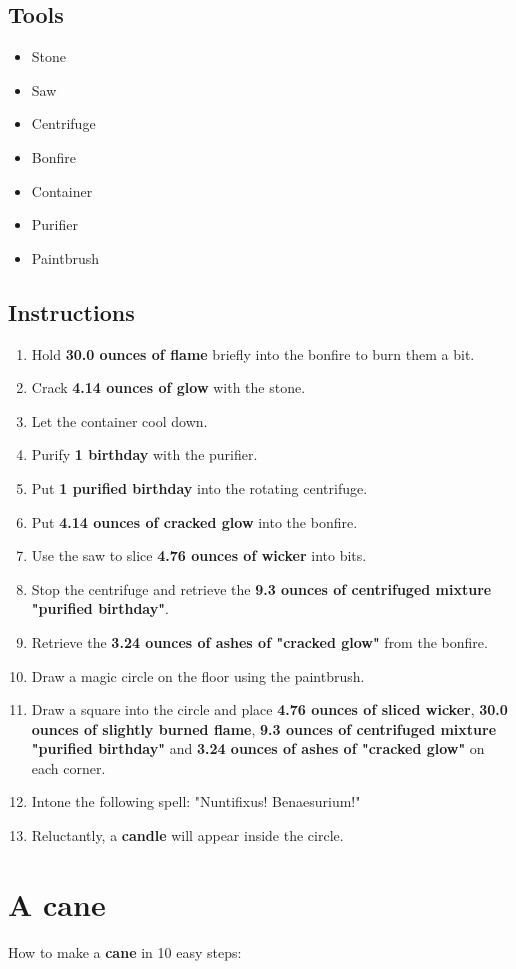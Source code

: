 \documentclass{article}
\begin{document}
\subsection{Tools}\begin{itemize}
\item 
Stone
\item 
Saw
\item 
Centrifuge
\item 
Bonfire
\item 
Container
\item 
Purifier
\item 
Paintbrush
\end{itemize}
\subsection{Instructions}\begin{enumerate}
\item 
Hold \textbf{30.0 ounces of flame} briefly into the bonfire to burn them a bit.
\item 
Crack \textbf{4.14 ounces of glow} with the stone.
\item 
Let the container cool down.
\item 
Purify \textbf{1 birthday} with the purifier.
\item 
Put \textbf{1 purified birthday} into the rotating centrifuge.
\item 
Put \textbf{4.14 ounces of cracked glow} into the bonfire.
\item 
Use the saw to slice \textbf{4.76 ounces of wicker} into bits.
\item 
Stop the centrifuge and retrieve the \textbf{9.3 ounces of centrifuged mixture "purified birthday"}.
\item 
Retrieve the \textbf{3.24 ounces of ashes of "cracked glow"} from the bonfire.
\item 
Draw a magic circle on the floor using the paintbrush.
\item 
Draw a square into the circle and place \textbf{4.76 ounces of sliced wicker}, \textbf{30.0 ounces of slightly burned flame}, \textbf{9.3 ounces of centrifuged mixture "purified birthday"} and \textbf{3.24 ounces of ashes of "cracked glow"} on each corner.
\item 
Intone the following spell: "Nuntifixus! Benaesurium!"
\item 
Reluctantly, a \textbf{candle} will appear inside the circle.
\end{enumerate}
\newpage
\section{A cane}How to make a \textbf{cane} in 10 easy steps:
\end{document}
